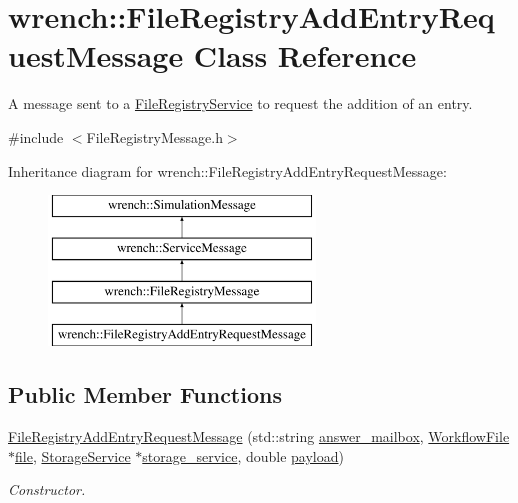 \hypertarget{classwrench_1_1_file_registry_add_entry_request_message}{}\section{wrench\+:\+:File\+Registry\+Add\+Entry\+Request\+Message Class Reference}
\label{classwrench_1_1_file_registry_add_entry_request_message}


A message sent to a \hyperlink{classwrench_1_1_file_registry_service}{File\+Registry\+Service} to request the addition of an entry.  




{\ttfamily \#include $<$File\+Registry\+Message.\+h$>$}

Inheritance diagram for wrench\+:\+:File\+Registry\+Add\+Entry\+Request\+Message\+:\begin{figure}[H]
\begin{center}
\leavevmode
\includegraphics[height=4.000000cm]{classwrench_1_1_file_registry_add_entry_request_message}
\end{center}
\end{figure}
\subsection*{Public Member Functions}
\begin{DoxyCompactItemize}
\item 
\hyperlink{classwrench_1_1_file_registry_add_entry_request_message_acb73050f3fee20e307faa2dee407dbca}{File\+Registry\+Add\+Entry\+Request\+Message} (std\+::string \hyperlink{classwrench_1_1_file_registry_add_entry_request_message_ad5f93da91104c2d9ce91ae6c1bc12cb6}{answer\+\_\+mailbox}, \hyperlink{classwrench_1_1_workflow_file}{Workflow\+File} $\ast$\hyperlink{classwrench_1_1_file_registry_add_entry_request_message_a852df55c4319cd183e92e68590fc6975}{file}, \hyperlink{classwrench_1_1_storage_service}{Storage\+Service} $\ast$\hyperlink{classwrench_1_1_file_registry_add_entry_request_message_a97af80a03ee957c5961c3f40b9da42a5}{storage\+\_\+service}, double \hyperlink{classwrench_1_1_simulation_message_a914f2732713f7c02898e66f05a7cb8a1}{payload})
\begin{DoxyCompactList}\small\item\em Constructor. \end{DoxyCompactList}\end{DoxyCompactItemize}
